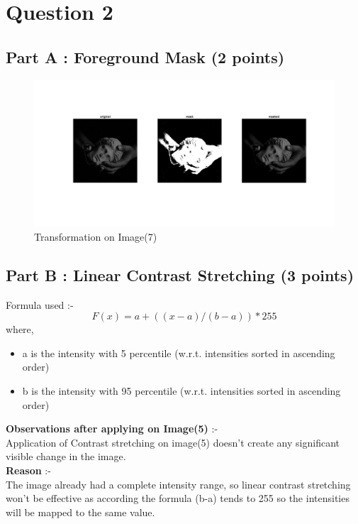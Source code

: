 \documentclass[12pt, a4paper]{article}
\begin{document}
\vspace*{-22pt}
\section*{Question 2}
\subsection*{Part A : Foreground Mask (2 points)}
\begin{figure}[H]
    \centering
    \includegraphics[width=\textwidth]{a7.jpg}
    \vspace*{-70pt}
    \caption{Transformation on Image(7)}
    \label{}
\end{figure}

\subsection*{Part B : Linear Contrast Stretching (3 points)}
Formula used :- \\
 $$ {F(x) = a + ((x-a)/(b-a))*255} $$
where,\\
\begin{itemize}
\vspace{-0.8 cm}
    \item a is the intensity with 5 percentile (w.r.t. intensities sorted in ascending order)
\vspace{-0.4 cm}
    \item b is the intensity with 95 percentile (w.r.t. intensities sorted in ascending order)
\end{itemize}
\textbf{Observations after applying on Image(5)} :-\\
Application of Contrast stretching on image(5) doesn't create any significant visible change in the image. \\
\textbf{Reason} :- \\
The image already had a complete intensity range, so linear contrast stretching won't be effective as according the formula (b-a) tends to 255 so the intensities will be mapped to the same value. \\  
\end{document}
